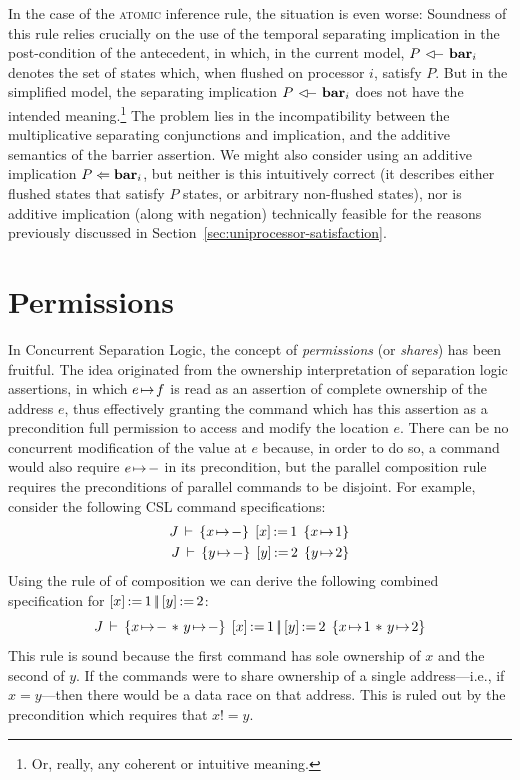\documentclass[11pt]{report}
\begin{document}
In the case of the \textsc{atomic} inference rule, the situation is even worse:  Soundness of this rule relies crucially on the use of the temporal separating implication in the post-condition of the antecedent, in which, in the current model, $P \fseqri \fbar{i}$ denotes the set of states which, when flushed on processor $i$, satisfy $P$. But in the simplified model, the separating implication $P \fseqri \fbar{i}$ does not have the intended meaning.\footnote{Or, really, any coherent or intuitive meaning.} The problem lies in the  incompatibility between the multiplicative separating conjunctions and implication, and the additive semantics of the barrier assertion. We might also consider using an additive implication $P \Leftarrow \mathbf{bar}_{i}$, but neither is this intuitively correct (it describes either flushed states that satisfy $P$ states, or arbitrary non-flushed states), nor is additive implication (along with negation) technically feasible for the reasons previously discussed in Section~\ref{sec:uniprocessor-satisfaction}. 

\section{Permissions} 
\label{sec:splitting-permissions}

In Concurrent Separation Logic, the concept of \emph{permissions} (or \emph{shares}) has been fruitful. The idea originated from the ownership interpretation of separation logic assertions, in which $e \!\mapsto\! f$ is read as an assertion of complete ownership of the address $e$, thus effectively granting the command which has this assertion as a precondition full permission to access and modify the location $e$. There can be no concurrent modification of the value at $e$ because, in order to do so, a command would also require $e \!\mapsto\! -$ in its precondition, but the parallel composition rule requires the preconditions of parallel commands to be disjoint. For example, consider the following CSL command specifications: \begin{align*}
  \spec{J}{x \fpointsto -}{\cstore{x}{1}}{x \fpointsto 1} \\ 
  \spec{J}{y \fpointsto -}{\cstore{y}{2}}{y \fpointsto 2}
\end{align*}Using the rule of of composition we can derive the following combined specification for $\left[ x \right] \operatorname{:\!=} 1 \operatorname{|\!|} \left[ y \right] \operatorname{:\!=} 2$: \[ \spec{J}{x \fpointsto - \fsep y \fpointsto -}{\cstore{x}{1} \oppar \cstore{y}{2}}{x \fpointsto 1 \fsep y \fpointsto 2} \] This rule is sound because the first command has sole ownership of $x$ and the second of $y$. If the commands were to share ownership of a single address---i.e., if $x = y$---then there would be a data race on that address. This is ruled out by the precondition which requires that $x != y$. 
\end{document}
